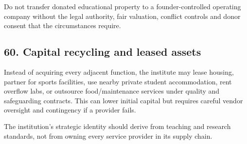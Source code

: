 Do not transfer donated educational property to a founder-controlled operating company without the legal authority, fair valuation, conflict controls and donor consent that the circumstances require.


\subsection{60. Capital recycling and leased assets}

Instead of acquiring every adjacent function, the institute may lease housing, partner for sports facilities, use nearby private student accommodation, rent overflow labs, or outsource food/maintenance services under quality and safeguarding contracts. This can lower initial capital but requires careful vendor oversight and contingency if a provider fails.

The institution's strategic identity should derive from teaching and research standards, not from owning every service provider in its supply chain.
